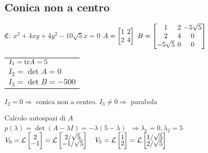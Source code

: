 \subsection{Conica non a centro}
$\mathfrak{C}:\ x^2+4xy+4y^2-10\sqrt{5}x=0$
$
A = \left[
	\arraycolsep=2.0pt\def\arraystretch{1.0}
	\begin{array}{@{}cc@{}}
		1 & 2 \\
		2 & 4
	\end{array}
\right]
\
B = \left[
	\arraycolsep=2.0pt\def\arraystretch{1.0}
	\begin{array}{@{}ccc@{}}
		1          & 2 & -5\sqrt{5} \\
		2          & 4 & 0 \\
		-5\sqrt{5} & 0 & 0 \\
	\end{array}
\right]
$
\begin{tabular}{l}
	$I_1 = \mathrm{tr} A = 5$ \\
	$I_2 = \det A = 0$ \\ 
	$I_3 = \det B = -500$
\end{tabular}
$I_2 = 0 \Rightarrow$ conica non a centro. $I_3 \neq 0 \Rightarrow$ parabola

Calcolo autospazi di $A$ \\
$p(\lambda) = \det(A-\lambda I) = -\lambda(5-\lambda)$
$\ \Rightarrow \lambda_1 = 0, \lambda_2 = 5$
$V_0 = \mathcal{L} 
\begin{bmatrix}
	2 \\[-0.3em]
	-1 \\
\end{bmatrix}
= \mathcal{L}
\begin{bmatrix}
	2/\sqrt{5} \\[-0.3em]
	-1/\sqrt{5} \\
\end{bmatrix}
\quad
V_5 = \mathcal{L} 
\begin{bmatrix}
	1 \\[-0.3em]
	2 \\
\end{bmatrix}
= \mathcal{L}
\begin{bmatrix}
	1/\sqrt{5} \\[-0.3em]
	2/\sqrt{5} \\
\end{bmatrix}
$

